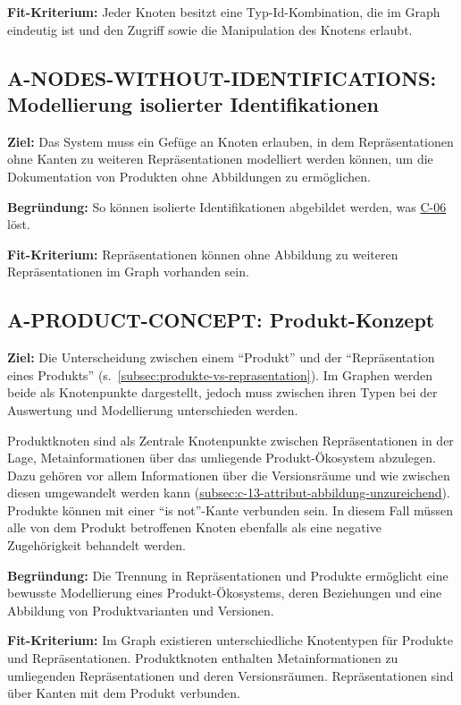 \textbf{Fit-Kriterium:}
Jeder Knoten besitzt eine Typ-Id-Kombination, die im Graph eindeutig ist und den Zugriff sowie die Manipulation des Knotens erlaubt.

\subsection{A-NODES-WITHOUT-IDENTIFICATIONS: Modellierung isolierter Identifikationen}\label{subsec:req-nodes-without-identification}

\textbf{Ziel:}
Das System muss ein Gefüge an Knoten erlauben, in dem Repräsentationen ohne Kanten zu weiteren Repräsentationen modelliert werden können, um die Dokumentation von Produkten ohne Abbildungen zu ermöglichen.

\textbf{Begründung:}
So können isolierte Identifikationen abgebildet werden, was \hyperref[subsec:c-06-falle-ohne-aktion-konnen-nicht-dokumentiert-werden]{C-06} löst.

\textbf{Fit-Kriterium:}
Repräsentationen können ohne Abbildung zu weiteren Repräsentationen im Graph vorhanden sein.

\subsection{A-PRODUCT-CONCEPT: Produkt-Konzept}\label{subsec:req-product-concept}

\textbf{Ziel:}
Die Unterscheidung zwischen einem \enquote{Produkt} und der \enquote{Repräsentation eines Produkts} (s.\ \autoref{subsec:produkte-vs-reprasentation}).
Im Graphen werden beide als Knotenpunkte dargestellt, jedoch muss zwischen ihren Typen bei der Auswertung und Modellierung unterschieden werden.

Produktknoten sind als Zentrale Knotenpunkte zwischen Repräsentationen in der Lage, Metainformationen über das umliegende Produkt-Ökosystem abzulegen.
Dazu gehören vor allem Informationen über die Versionsräume und wie zwischen diesen umgewandelt werden kann (\hyperref[C-13]{subsec:c-13-attribut-abbildung-unzureichend}).
Produkte können mit einer \enquote{is not}-Kante verbunden sein.
In diesem Fall müssen alle von dem Produkt betroffenen Knoten ebenfalls als eine negative Zugehörigkeit behandelt werden.

\textbf{Begründung:}
Die Trennung in Repräsentationen und Produkte ermöglicht eine bewusste Modellierung eines Produkt-Ökosystems, deren Beziehungen und eine Abbildung von Produktvarianten und Versionen.

\textbf{Fit-Kriterium:}
Im Graph existieren unterschiedliche Knotentypen für Produkte und Repräsentationen.
Produktknoten enthalten Metainformationen zu umliegenden Repräsentationen und deren Versionsräumen.
Repräsentationen sind über Kanten mit dem Produkt verbunden.

